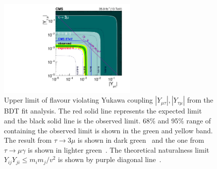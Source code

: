 \begin{figure}[htpb]
\begin{center}
\includegraphics[width=0.6\textwidth]{chapter8/yukawaMuon_dark.pdf}
\end{center}
\caption[Upper limit of flavour violating Yukawa coupling  from the $H \to \mu\tau$ BDT fit analysis]{Upper limit of flavour violating Yukawa coupling $|Y_{\mu\tau}|, |Y_{\tau\mu}|$ from the BDT fit analysis. The red solid line represents the expected limit and the black solid line is the observed limit. 68\% and 95\% range of containing the observed limit is shown in the green and yellow band. The result from $\tau \to 3 \mu$ is shown in dark green~\cite{Hayasaka:2010np,Olive:2016xmw,Harnik:2012pb} and the one from $\tau \to \mu\gamma$ is shown in lighter green~\cite{Olive:2016xmw,Harnik:2012pb}. The theoretical naturalness limit $Y_{ij}Y_{ji} \leq m_im_j/v^2$ is shown by purple diagonal line~\cite{Harnik:2012pb}.}

\label{fig:Yukawas}
\end{figure}






